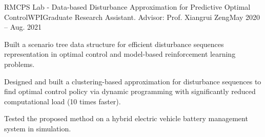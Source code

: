 \begin{rSubsection}{RMCPS Lab - Data-based Disturbance Approximation for Predictive Optimal Control}{WPI}{Graduate Research Assistant. Advisor: Prof. Xiangrui Zeng}{May 2020 -- Aug. 2021}
\item Built a scenario tree data structure for efficient disturbance sequences representation in optimal control and model-based reinforcement learning problems.
\item Designed and built a clustering-based approximation for disturbance sequences to find optimal control policy via dynamic programming with significantly reduced computational load (10 times faster).
\item Tested the proposed method on a hybrid electric vehicle battery management system in simulation.
\end{rSubsection}